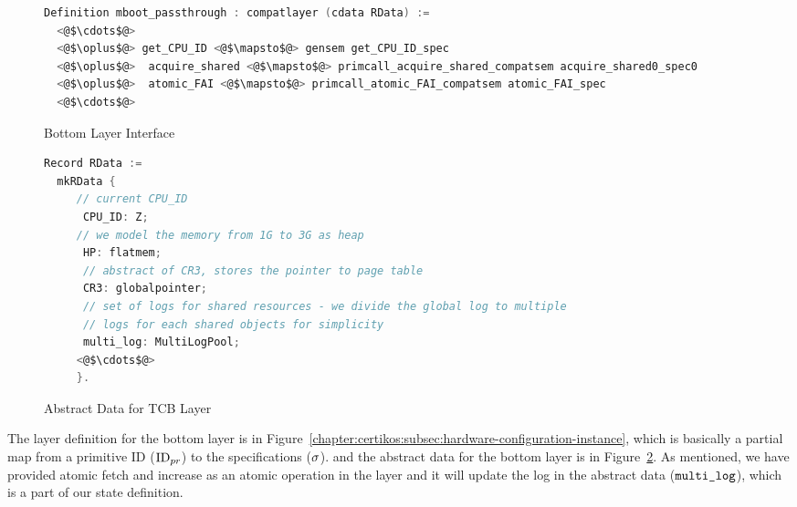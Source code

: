\begin{figure}
\begin{lstlisting}[language=C]
Definition mboot_passthrough : compatlayer (cdata RData) :=
  <@$\cdots$@>
  <@$\oplus$@> get_CPU_ID <@$\mapsto$@> gensem get_CPU_ID_spec
  <@$\oplus$@>  acquire_shared <@$\mapsto$@> primcall_acquire_shared_compatsem acquire_shared0_spec0
  <@$\oplus$@>  atomic_FAI <@$\mapsto$@> primcall_atomic_FAI_compatsem atomic_FAI_spec
  <@$\cdots$@>
\end{lstlisting}
\caption{Bottom Layer Interface}
\label{fig:chapter:certikos:bottom-layer-interface}
\end{figure}

\begin{figure}
\begin{lstlisting}[language=C]
Record RData :=
  mkRData {
     // current CPU_ID
      CPU_ID: Z;
     // we model the memory from 1G to 3G as heap            
      HP: flatmem;     
      // abstract of CR3, stores the pointer to page table
      CR3: globalpointer;
      // set of logs for shared resources - we divide the global log to multiple
      // logs for each shared objects for simplicity   
      multi_log: MultiLogPool;     
     <@$\cdots$@>
     }.
\end{lstlisting}
\caption{Abstract Data for TCB Layer}
\label{fig:chapter:certikos:abstract-data-for-bottom-layer}
\end{figure}

The layer definition for the bottom layer is in Figure~\ref{chapter:certikos:subsec:hardware-configuration-instance},
which is basically a partial map from a primitive ID (${\mathrm{ID}_{pr}}$) to the specifications ($\sigma$).
and the abstract data for the bottom layer is in Figure~\ref{fig:chapter:certikos:abstract-data-for-bottom-layer}.
As mentioned, 
we have provided atomic fetch and increase as an atomic operation in the layer 
and it will update the log in the abstract data (${\mathrm{\texttt{multi\_log}}}$), which is 
a part of our state definition. 

